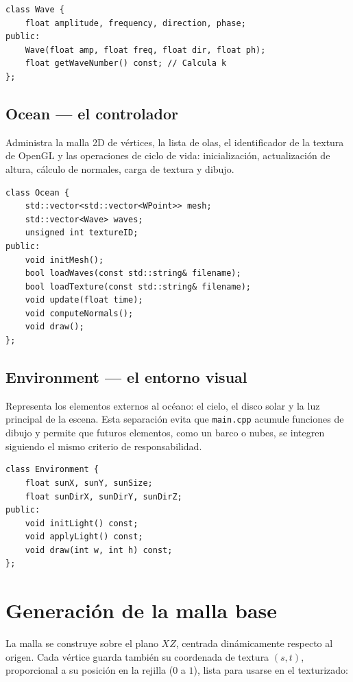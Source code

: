 ﻿\documentclass[11pt]{article}
\begin{document}
\begin{lstlisting}
class Wave {
    float amplitude, frequency, direction, phase;
public:
    Wave(float amp, float freq, float dir, float ph);
    float getWaveNumber() const; // Calcula k
};
\end{lstlisting}

\subsection{Ocean --- el controlador}

Administra la malla 2D de vértices, la lista de olas, el identificador de la
textura de OpenGL y las operaciones de ciclo de vida: inicialización,
actualización de altura, cálculo de normales, carga de textura y dibujo.

\begin{lstlisting}
class Ocean {
    std::vector<std::vector<WPoint>> mesh;
    std::vector<Wave> waves;
    unsigned int textureID;
public:
    void initMesh();
    bool loadWaves(const std::string& filename);
    bool loadTexture(const std::string& filename);
    void update(float time);
    void computeNormals();
    void draw();
};
\end{lstlisting}
\subsection{Environment --- el entorno visual}

Representa los elementos externos al océano: el cielo, el disco solar y la luz
principal de la escena. Esta separación evita que \texttt{main.cpp} acumule
funciones de dibujo y permite que futuros elementos, como un barco o nubes, se
integren siguiendo el mismo criterio de responsabilidad.

\begin{lstlisting}
class Environment {
    float sunX, sunY, sunSize;
    float sunDirX, sunDirY, sunDirZ;
public:
    void initLight() const;
    void applyLight() const;
    void draw(int w, int h) const;
};
\end{lstlisting}

\section{Generación de la malla base}

La malla se construye sobre el plano $XZ$, centrada dinámicamente respecto al
origen. Cada vértice guarda también su coordenada de textura $(s,t)$,
proporcional a su posición en la rejilla ($0$ a $1$), lista para usarse en el
texturizado:
\end{document}
